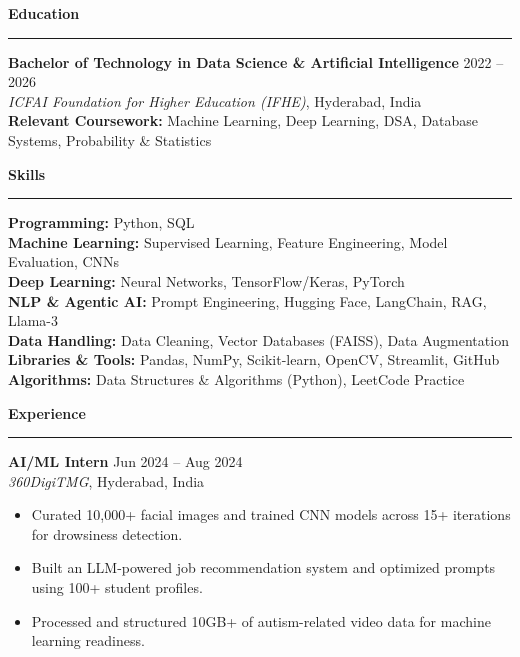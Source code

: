 \documentclass[9pt, letterpaper]{article}
\newcommand{\sectionheading}[1]{%
    \vspace{4pt}%
    {\large \textbf{#1}}%
    \vspace{1pt}%
    \hrule
    \vspace{2pt}%
}
\begin{document}
\sectionheading{Education}
\textbf{Bachelor of Technology in Data Science \& Artificial Intelligence} \hfill 2022 -- 2026 \\
\textit{ICFAI Foundation for Higher Education (IFHE)}, Hyderabad, India \\
\textbf{Relevant Coursework:} Machine Learning, Deep Learning, DSA, Database Systems, Probability \& Statistics

\sectionheading{Skills}
\textbf{Programming:} Python, SQL\\
\textbf{Machine Learning:} Supervised Learning, Feature Engineering, Model Evaluation, CNNs\\
\textbf{Deep Learning:} Neural Networks, TensorFlow/Keras, PyTorch\\
\textbf{NLP \& Agentic AI:} Prompt Engineering, Hugging Face, LangChain, RAG, Llama-3\\
\textbf{Data Handling:} Data Cleaning, Vector Databases (FAISS), Data Augmentation\\
\textbf{Libraries \& Tools:} Pandas, NumPy, Scikit-learn, OpenCV, Streamlit, GitHub\\
\textbf{Algorithms:} Data Structures \& Algorithms (Python), LeetCode Practice

\sectionheading{Experience}
\textbf{AI/ML Intern} \hfill Jun 2024 -- Aug 2024 \\
\textit{360DigiTMG}, Hyderabad, India
\begin{itemize}[leftmargin=0.25in, itemindent=-0.15in, label={--}]
    \item Curated 10,000+ facial images and trained CNN models across 15+ iterations for drowsiness detection.
    \item Built an LLM-powered job recommendation system and optimized prompts using 100+ student profiles.
    \item Processed and structured 10GB+ of autism-related video data for machine learning readiness.
\end{itemize}
\end{document}
